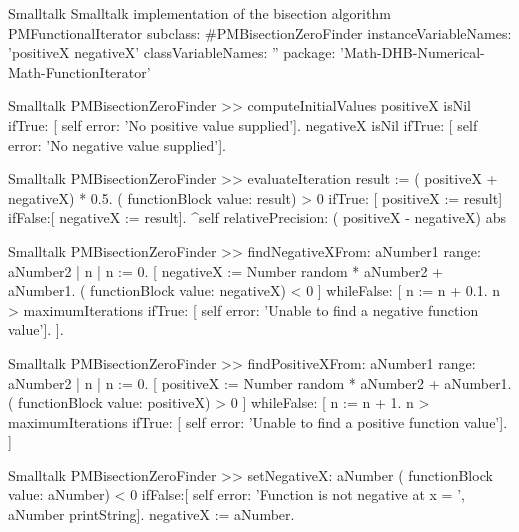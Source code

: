 \begin{listing}[label=lst:bisection]{Smalltalk}
{Smalltalk implementation of the bisection algorithm}
PMFunctionalIterator subclass: #PMBisectionZeroFinder
   instanceVariableNames: 'positiveX negativeX'
   classVariableNames: ''
   package: 'Math-DHB-Numerical-Math-FunctionIterator'
\end{listing}

\begin{displaycode}{Smalltalk}
PMBisectionZeroFinder >> computeInitialValues
    positiveX isNil
        ifTrue: [ self error: 'No positive value supplied'].
    negativeX isNil
        ifTrue: [ self error: 'No negative value supplied'].
\end{displaycode}

\begin{displaycode}{Smalltalk}
PMBisectionZeroFinder >> evaluateIteration
    result := ( positiveX + negativeX) * 0.5.
    ( functionBlock value: result) > 0
        ifTrue: [ positiveX := result]
        ifFalse:[ negativeX := result].
    ^self relativePrecision: ( positiveX - negativeX) abs
\end{displaycode}

\begin{displaycode}{Smalltalk}
PMBisectionZeroFinder >> findNegativeXFrom: aNumber1 range: aNumber2
    | n |
    n := 0.
    [ negativeX := Number random * aNumber2 + aNumber1.
      ( functionBlock value: negativeX) < 0
        ] whileFalse: [ n := n + 0.1.
                        n > maximumIterations
                            ifTrue: [ self error: 'Unable to find a 
                                            negative function value'].
                      ].
\end{displaycode}

\begin{displaycode}{Smalltalk}
PMBisectionZeroFinder >> findPositiveXFrom: aNumber1 range: aNumber2
    | n |
    n := 0.
    [ positiveX := Number random * aNumber2 + aNumber1.
      ( functionBlock value: positiveX) > 0
        ] whileFalse: [ n := n + 1.
                        n > maximumIterations
                            ifTrue: [ self error: 'Unable to find a 
                                            positive function value'].
                      ]
\end{displaycode}

\begin{displaycode}{Smalltalk}
PMBisectionZeroFinder >> setNegativeX: aNumber
    ( functionBlock value: aNumber) < 0
        ifFalse:[ self error: 'Function is not negative at x = ', 
                                                 aNumber printString].
    negativeX := aNumber.
\end{displaycode}

